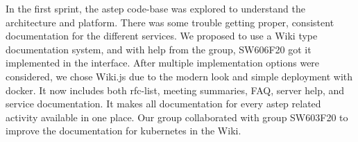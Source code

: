 \FloatBarrier
{}
In the first sprint, the \gls{astep} code-base was explored to understand the architecture and platform. There was some trouble getting proper, consistent documentation for the different services.
We proposed to use a Wiki type documentation system, and with help from the group, SW606F20 got it implemented in the interface. After multiple implementation options were considered, we chose Wiki.js \cite{wikijs} due to the modern look and simple deployment with \gls{docker}. It now includes both \gls{rfc}-list, meeting summaries, FAQ, server help, and service documentation. It makes all documentation for every \gls{astep} related activity available in one place. Our group collaborated with group SW603F20 to improve the documentation for \gls{kubernetes} in the Wiki.